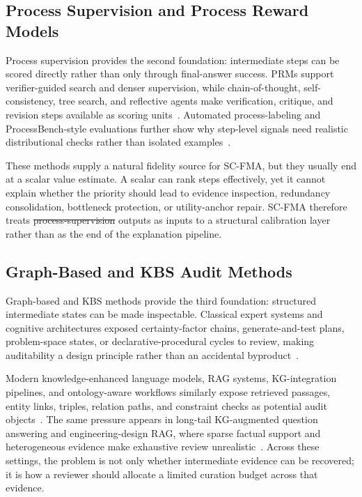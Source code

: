 \documentclass[a4paper,fleqn]{cas-sc}
\makeatletter
\providecommand{\DIFaddtex}[1]{{\protect\color{blue}\uwave{#1}}} %
\providecommand{\DIFdeltex}[1]{{\protect\color{red}\sout{#1}}} %
\providecommand{\DIFaddbegin}{} %
\providecommand{\DIFaddend}{} %
\providecommand{\DIFdelbegin}{} %
\providecommand{\DIFdelend}{} %
\providecommand{\DIFadd}[1]{\texorpdfstring{\DIFaddtex{#1}}{#1}} %
\providecommand{\DIFdel}[1]{\texorpdfstring{\DIFdeltex{#1}}{}} %
\providecommand{\DIFscaledelfig}{0.5}
\newlength{\DIFdelgraphicswidth} %
\newlength{\DIFdelgraphicsheight} %
\providecommand{\DIFaddincludegraphics}[2][]{{\color{blue}\fbox{\DIFOincludegraphics[#1]{#2}}}} %
\providecommand{\DIFdelincludegraphics}[2][]{%
\sbox{\DIFdelgraphicsbox}{\DIFOincludegraphics[#1]{#2}}%
\settoboxwidth{\DIFdelgraphicswidth}{\DIFdelgraphicsbox} %
\settoboxtotalheight{\DIFdelgraphicsheight}{\DIFdelgraphicsbox} %
\scalebox{\DIFscaledelfig}{%
\parbox[b]{\DIFdelgraphicswidth}{\usebox{\DIFdelgraphicsbox}\\[-\baselineskip] \rule{\DIFdelgraphicswidth}{0em}}\llap{\resizebox{\DIFdelgraphicswidth}{\DIFdelgraphicsheight}{%
\setlength{\unitlength}{\DIFdelgraphicswidth}%
\begin{picture}(1,1)%
\thicklines\linethickness{2pt} %
{\color[rgb]{1,0,0}\put(0,0){\framebox(1,1){}}}%
{\color[rgb]{1,0,0}\put(0,0){\line( 1,1){1}}}%
{\color[rgb]{1,0,0}\put(0,1){\line(1,-1){1}}}%
\end{picture}%
}\hspace*{3pt}}} %
} %
\DeclareRobustCommand{\DIFaddbegin}{\DIFOaddbegin \let\includegraphics\DIFaddincludegraphics} %
\DeclareRobustCommand{\DIFaddend}{\DIFOaddend \let\includegraphics\DIFOincludegraphics} %
\DeclareRobustCommand{\DIFdelbegin}{\DIFOdelbegin \let\includegraphics\DIFdelincludegraphics} %
\DeclareRobustCommand{\DIFdelend}{\DIFOaddend \let\includegraphics\DIFOincludegraphics} %
\let\sout@orig\sout %
\renewcommand{\sout}[1]{\ifmmode\text{\sout@orig{\ensuremath{#1}}}\else\sout@orig{#1}\fi} %
\makeatother
\begin{document}
\subsection{Process Supervision and Process Reward Models}

Process supervision provides the second foundation: intermediate steps can be scored directly rather than only through final-answer success. PRMs support verifier-guided search and denser supervision, while chain-of-thought, self-consistency, tree search, and reflective agents make verification, critique, and revision steps available as scoring units~\cite{lightman2023verify,uesato2022solving,cobbe2021training,wei2022cot,wang2022selfconsistency,yao2023tot,yao2022react,shinn2023reflexion,madaan2023selfrefine}. Automated process-labeling and ProcessBench-style evaluations further show why step-level signals need realistic distributional checks rather than isolated examples~\cite{wang2024mathshepherd,zheng2024processbench}.

These methods supply a natural fidelity source for SC-FMA, but they usually end at a scalar value estimate. A scalar can rank steps effectively, yet it cannot explain whether the priority should lead to evidence inspection, redundancy consolidation, bottleneck protection, or utility-anchor repair. SC-FMA therefore treats \DIFdelbegin \DIFdel{process-supervision }\DIFdelend \DIFaddbegin \DIFadd{process supervision }\DIFaddend outputs as inputs to a structural calibration layer rather than as the end of the explanation pipeline.

\subsection{Graph-Based and KBS Audit Methods}

Graph-based and KBS methods provide the third foundation: structured intermediate states can be made inspectable. Classical expert systems and cognitive architectures exposed certainty-factor chains, generate-and-test plans, problem-space states, or declarative-procedural cycles to review, making auditability a design principle rather than an accidental byproduct~\cite{buchanan1984mycin,lindsay1980dendral,laird2012soar,anderson2004actr}.

Modern knowledge-enhanced language models, RAG systems, KG-integration pipelines, and ontology-aware workflows similarly expose retrieved passages, entity links, triples, relation paths, and constraint checks as potential audit objects~\cite{lewis2020rag,gao2023ragsurvey,hu2024knowledgeenhanced,pan2024unifying,yang2025kbllmsurvey,chen2025kgquality,dai2025llmkg}. The same pressure appears in long-tail KG-augmented question answering and engineering-design RAG, where sparse factual support and heterogeneous evidence make exhaustive review unrealistic~\cite{huang2025prompting,siddharth2024retrieval,liu2025knowledgereasoning}. Across these settings, the problem is not only whether intermediate evidence can be recovered; it is how a reviewer should allocate a limited curation budget across that evidence.
\end{document}

